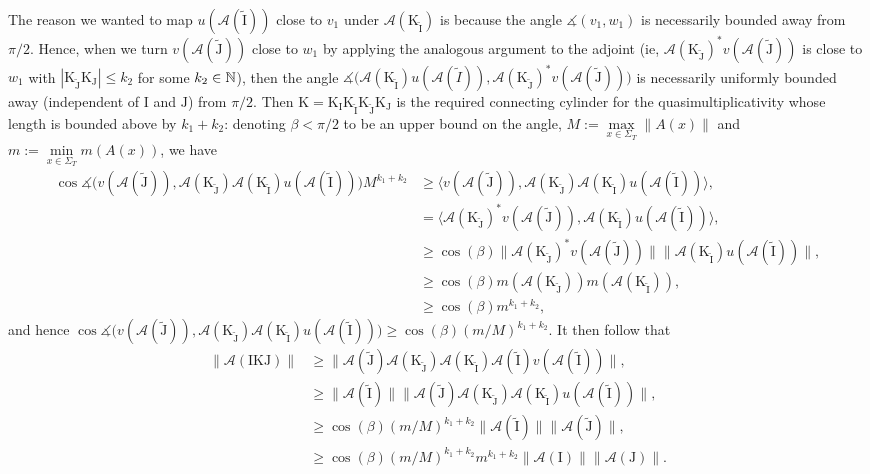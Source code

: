\documentclass[11pt,oneside,reqno]{amsart}
\numberwithin{equation}{section}
\numberwithin{figure}{section}
\theoremstyle{definition}
\theoremstyle{definition}
\theoremstyle{definition}
\theoremstyle{definition}
\theoremstyle{remark}
\theoremstyle{definition}
\theoremstyle{definition}
\theoremstyle{definition}
\def\A{\mathcal{A}}
\def\I{\mathrm{I}}
\def\J{\mathrm{J}}
\def\K{\mathrm{K}}
\def\mangle{\measuredangle}
\newcommand{\Sig}{\Sigma_T}
\begin{document}
The reason we wanted to map $u(\A(\tilde{\I}))$ close to $v_1$ under $\A(\K_{\tilde{\I}})$ is because the angle $\mangle (v_1,w_1)$ is necessarily bounded away from $\pi/2$. Hence, when we turn $v(\A(\tilde{\J}))$ close to $w_1$ by applying the analogous argument to the adjoint (ie, $\A(\K_{\tilde{\J}})^*v(\A(\tilde{\J}))$ is close to $w_1$ with $|\K_{\tilde{\J}}\K_\J| \leq k_2$ for some $k_2 \in \mathbb{N}$), then the angle $\mangle\big(\A(\K_{\tilde{\I}})u(\A(\tilde{I})),\A(\K_{\tilde{\J}})^* v(\A(\tilde{\J}))\big)$ is necessarily uniformly  bounded away (independent of $\I$ and $\J$) from $\pi/2$. Then $\K = \K_\I\K_{\tilde{\I}}\K_{\tilde{\J}}\K_\J$ is the required connecting cylinder for the quasimultiplicativity whose length is bounded above by $k_1+k_2$: denoting $\beta <\pi/2$ to be an upper bound on the angle, $M :=\max\limits_{x \in \Sig}\|A(x)\|$ and $m:=\min\limits_{x \in \Sig}m(A(x))$, we have 
\begin{align*}
\cos \mangle\big(v(\A(\tilde{\J})), \A(\K_{\tilde{\J}})\A(\K_{\tilde{\I}})u(\A(\tilde{\I}))\big) M^{k_1+k_2}
&\geq\big\langle v(\A(\tilde{\J})), \A(\K_{\tilde{\J}})\A(\K_{\tilde{\I}})u(\A(\tilde{\I})) \big\rangle,\\
&= \big\langle \A(\K_{\tilde{\J}})^*v(\A(\tilde{\J})), \A(\K_{\tilde{\I}})u(\A(\tilde{\I})) \big\rangle,\\
&\geq \cos(\beta)\|\A(\K_{\tilde{\J}})^*v(\A(\tilde{\J}))\|\|\A(\K_{\tilde{\I}})u(\A(\tilde{\I}))\|,\\
&\geq \cos(\beta)m(\A(\K_{\tilde{\J}}))m(\A(\K_{\tilde{\I}})),\\
&\geq \cos(\beta) m^{k_1+k_2},
\end{align*}
and hence $\cos \mangle\big(v(\A(\tilde{\J})), \A(\K_{\tilde{\J}})\A(\K_{\tilde{\I}})u(\A(\tilde{\I}))\big) \geq \cos(\beta)(m/M)^{k_1+k_2}$.
It then follow that
\begin{align*}
\|\A(\I\K\J)\| &\geq \|\A({\tilde{\J}})\A(\K_{\tilde{\J}})\A(\K_{\tilde{\I}})\A({\tilde{\I}})v(\A(\tilde{\I}))\|,\\
&\geq \|\A(\tilde{\I})\|\|\A({\tilde{\J}})\A(\K_{\tilde{\J}})\A(\K_{\tilde{\I}}) u(\A(\tilde{\I}))\|,\\
&\geq \cos(\beta)(m/M)^{k_1+k_2}\|\A(\tilde{\I})\|\|\A(\tilde{\J})\|,\\
&\geq \cos(\beta)(m/M)^{k_1+k_2}m^{k_1+k_2}\|\A(\I)\|\|\A(\J)\|.
\end{align*}
\end{document}
